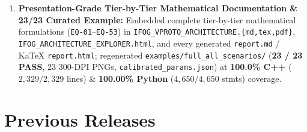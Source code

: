 \documentclass[11pt,a4paper]{article}
\begin{document}
\begin{enumerate}
    \item \textbf{Presentation-Grade Tier-by-Tier Mathematical Documentation \& 23/23 Curated Example:}
    Embedded complete tier-by-tier mathematical formulations (\texttt{EQ-01}--\texttt{EQ-53}) in \texttt{IFOG\_VPROTO\_ARCHITECTURE.\{md,tex,pdf\}}, \texttt{IFOG\_ARCHITECTURE\_EXPLORER.html}, and every generated \texttt{report.md} / KaTeX \texttt{report.html}; regenerated \texttt{examples/full\_all\_scenarios/} (\textbf{23 / 23 PASS}, 23 300-DPI PNGs, \texttt{calibrated\_params.json}) at \textbf{100.0\% C++} ($2{,}329/2{,}329$ lines) \& \textbf{100.00\% Python} ($4{,}650/4{,}650$ stmts) coverage.
\end{enumerate}

\section{Previous Releases}
\end{document}
